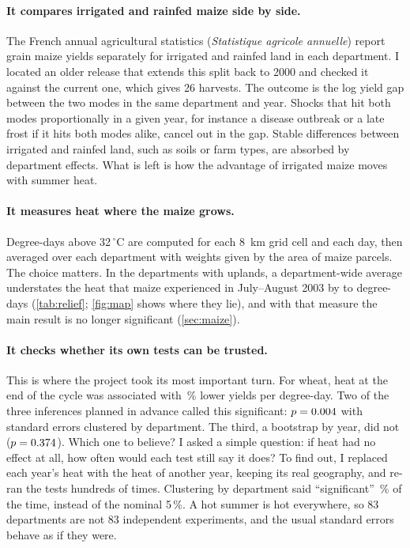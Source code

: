 \paragraph{It compares irrigated and rainfed maize side by side.} The French annual agricultural statistics (\emph{Statistique agricole annuelle}) report grain maize yields separately for irrigated and rainfed land in each department. I located an older release that extends this split back to 2000 and checked it against the current one, which gives 26 harvests. The outcome is the log yield gap between the two modes in the same department and year. Shocks that hit both modes proportionally in a given year, for instance a disease outbreak or a late frost if it hits both modes alike, cancel out in the gap. Stable differences between irrigated and rainfed land, such as soils or farm types, are absorbed by department effects. What is left is how the advantage of irrigated maize moves with summer heat.

\paragraph{It measures heat where the maize grows.} Degree-days above 32\,$^{\circ}$C are computed for each 8~km grid cell and each day, then averaged over each department with weights given by the area of maize parcels. The choice matters. In the \ReliefCount{} departments with uplands, a department-wide average understates the heat that maize experienced in July--August 2003 by \ReliefGapSmallMin{} to \ReliefGapMax{} degree-days (\cref{tab:relief}; \cref{fig:map} shows where they lie), and with that measure the main result is no longer significant (\cref{sec:maize}).

\paragraph{It checks whether its own tests can be trusted.} This is where the project took its most important turn. For wheat, heat at the end of the cycle was associated with \WheatPct\,\% lower yields per degree-day. Two of the three inferences planned in advance called this significant: $p = 0.004$ with standard errors clustered by department. The third, a bootstrap by year, did not ($p = 0.374$). Which one to believe? I asked a simple question: if heat had no effect at all, how often would each test still say it does? To find out, I replaced each year's heat with the heat of another year, keeping its real geography, and re-ran the tests hundreds of times. Clustering by department said ``significant'' \WheatSizeDep\,\% of the time, instead of the nominal 5\,\%. A hot summer is hot everywhere, so 83 departments are not 83 independent experiments, and the usual standard errors behave as if they were.

